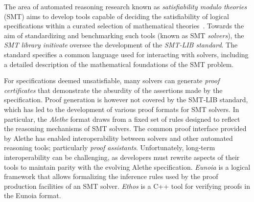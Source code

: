 \documentclass[class=llncs, crop=false]{standalone}
\begin{document}
%
The area of automated reasoning research known as
\emph{satisfiability modulo theories} (SMT)
aims to develop tools capable of deciding
the satisfiability of logical specifications
within a curated selection of mathematical theories~\cite{Barrett2021}.
%
%
Towards the aim of standardizing and benchmarking
such tools (known as SMT \emph{solvers}),
the \emph{SMT library initivate} oversee the development of
the \emph{SMT-LIB standard}.
%
The standard specifies a common language used
for interacting with solvers, including a detailed
description of the mathematical foundations of the SMT problem.


%


For specifications deemed unsatisfiable, many solvers
can generate \emph{proof certificates} that demonstrate
the absurdity of the assertions made by the specification.
%
Proof generation is however not covered by the SMT-LIB
standard, which has led to the development of various proof
formats for SMT solvers.
In particular, the \emph{Alethe} format draws from
a fixed set of rules designed to reflect the
reasoning mechanisms of SMT solvers.
%
The common proof interface provided by Alethe has
enabled interoperability between solvers and other
automated reasoning tools;
particularly \emph{proof assistants}.
%
Unfortunately, long-term interoperability can be
challenging, as developers must rewrite aspects
of their tools to maintain parity with the evolving
Alethe specification.
%
\textit{Eunoia} is a logical framework that allows formalizing
the inference rules used by the proof production facilities
of an SMT solver.
%
\textit{Ethos} is a C++ tool for verifying proofs in the
Eunoia format.

%
\end{document}
